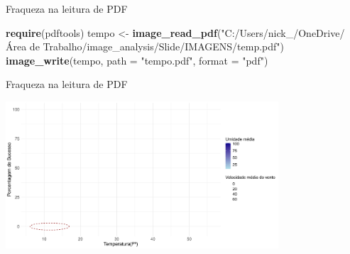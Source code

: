 \documentclass[
  ignorenonframetext,
]{beamer}
\newenvironment{Shaded}{\begin{snugshade}}{\end{snugshade}}
\newcommand{\DataTypeTok}[1]{\textcolor[rgb]{0.13,0.29,0.53}{#1}}
\newcommand{\KeywordTok}[1]{\textcolor[rgb]{0.13,0.29,0.53}{\textbf{#1}}}
\newcommand{\NormalTok}[1]{#1}
\newcommand{\StringTok}[1]{\textcolor[rgb]{0.31,0.60,0.02}{#1}}
\begin{document}
\begin{frame}[fragile]{Fraqueza na leitura de PDF}
\protect\hypertarget{fraqueza-na-leitura-de-pdf}{}

\begin{Shaded}
\begin{Highlighting}[]
\KeywordTok{require}\NormalTok{(pdftools)}
\NormalTok{tempo <-}\StringTok{ }\KeywordTok{image_read_pdf}\NormalTok{(}\StringTok{"C:/Users/nick_/OneDrive/Área de Trabalho/image_analysis/Slide/IMAGENS/temp.pdf"}\NormalTok{)}
\KeywordTok{image_write}\NormalTok{(tempo, }\DataTypeTok{path =} \StringTok{"tempo.pdf"}\NormalTok{, }\DataTypeTok{format =} \StringTok{"pdf"}\NormalTok{)}
\end{Highlighting}
\end{Shaded}

\end{frame}

\begin{frame}{Fraqueza na leitura de PDF}
\protect\hypertarget{fraqueza-na-leitura-de-pdf-1}{}

\small

\includegraphics[width=4.0in]{tempo}

\begin{center}
\tiny{}
\end{center}

\end{frame}

\begin{frame}{}
\protect\hypertarget{section}{}

\end{frame}
\end{document}
